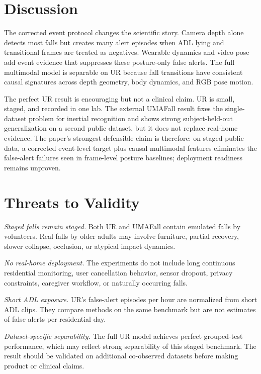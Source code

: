 \documentclass[journal]{IEEEtran}
\begin{document}
\section{Discussion}
The corrected event protocol changes the scientific story. Camera depth alone detects most falls but creates many alert episodes when ADL lying and transitional frames are treated as negatives. Wearable dynamics and video pose add event evidence that suppresses these posture-only false alerts. The full multimodal model is separable on UR because fall transitions have consistent causal signatures across depth geometry, body dynamics, and RGB pose motion.

The perfect UR result is encouraging but not a clinical claim. UR is small, staged, and recorded in one lab. The external UMAFall result fixes the single-dataset problem for inertial recognition and shows strong subject-held-out generalization on a second public dataset, but it does not replace real-home evidence. The paper's strongest defensible claim is therefore: on staged public data, a corrected event-level target plus causal multimodal features eliminates the false-alert failures seen in frame-level posture baselines; deployment readiness remains unproven.

\section{Threats to Validity}
\textit{Staged falls remain staged.} Both UR and UMAFall contain emulated falls by volunteers. Real falls by older adults may involve furniture, partial recovery, slower collapse, occlusion, or atypical impact dynamics.

\textit{No real-home deployment.} The experiments do not include long continuous residential monitoring, user cancellation behavior, sensor dropout, privacy constraints, caregiver workflow, or naturally occurring falls.

\textit{Short ADL exposure.} UR's false-alert episodes per hour are normalized from short ADL clips. They compare methods on the same benchmark but are not estimates of false alerts per residential day.

\textit{Dataset-specific separability.} The full UR model achieves perfect grouped-test performance, which may reflect strong separability of this staged benchmark. The result should be validated on additional co-observed datasets before making product or clinical claims.
\end{document}
